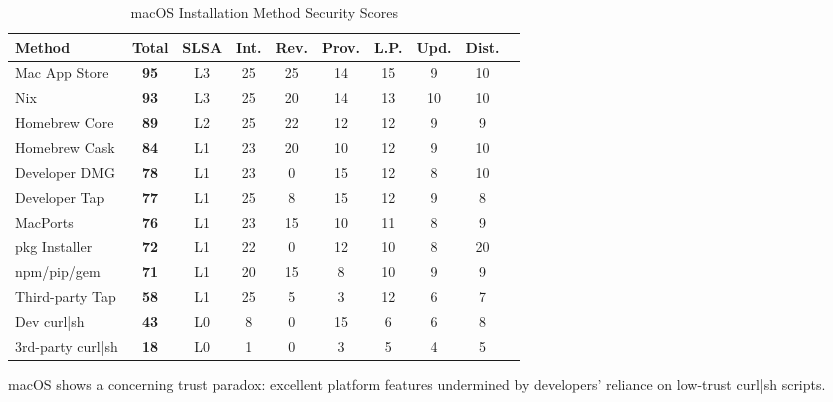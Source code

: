 \documentclass[11pt,a4paper]{article}
\begin{document}
\begin{table}[h]
\centering
\caption{macOS Installation Method Security Scores}
\begin{tabular}{lccccccccc}
\toprule
\textbf{Method} & \textbf{Total} & \textbf{SLSA} & \textbf{Int.} & \textbf{Rev.} & \textbf{Prov.} & \textbf{L.P.} & \textbf{Upd.} & \textbf{Dist.} \\
\midrule
Mac App Store & \textbf{95} & L3 & 25 & 25 & 14 & 15 & 9 & 10 \\
Nix & \textbf{93} & L3 & 25 & 20 & 14 & 13 & 10 & 10 \\
Homebrew Core & \textbf{89} & L2 & 25 & 22 & 12 & 12 & 9 & 9 \\
Homebrew Cask & \textbf{84} & L1 & 23 & 20 & 10 & 12 & 9 & 10 \\
Developer DMG & \textbf{78} & L1 & 23 & 0 & 15 & 12 & 8 & 10 \\
Developer Tap & \textbf{77} & L1 & 25 & 8 & 15 & 12 & 9 & 8 \\
MacPorts & \textbf{76} & L1 & 23 & 15 & 10 & 11 & 8 & 9 \\
pkg Installer & \textbf{72} & L1 & 22 & 0 & 12 & 10 & 8 & 20 \\
npm/pip/gem & \textbf{71} & L1 & 20 & 15 & 8 & 10 & 9 & 9 \\
Third-party Tap & \textbf{58} & L1 & 25 & 5 & 3 & 12 & 6 & 7 \\
Dev curl|sh & \textbf{43} & L0 & 8 & 0 & 15 & 6 & 6 & 8 \\
3rd-party curl|sh & \textbf{18} & L0 & 1 & 0 & 3 & 5 & 4 & 5 \\
\bottomrule
\end{tabular}
\end{table}

macOS shows a concerning trust paradox: excellent platform features undermined by developers' reliance on low-trust curl|sh scripts.
\end{document}
